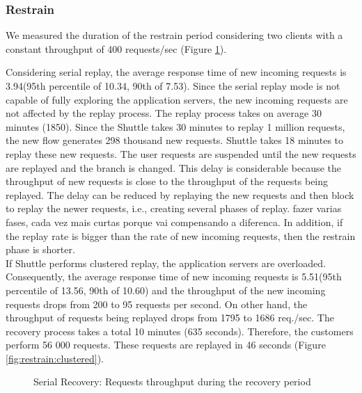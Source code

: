 \subsubsection{Restrain}\label{sec:eval:recovery:restrain}
We measured the duration of the restrain period considering two clients with a constant throughput of 400 requests/sec (Figure \ref{fig:restrain:serial}). 

Considering serial replay, the average response time of new incoming requests is 3.94\ms (95th percentile of 10.34\ms, 90th of 7.53\ms). Since the serial replay mode is not capable of fully exploring the application servers, the new incoming requests are not affected by the replay process. The replay process takes on average 30 minutes (1850\ms). Since the Shuttle takes 30 minutes to replay 1 million requests, the new flow generates 298 thousand new requests. Shuttle takes 18 minutes to replay these new requests. The user requests are suspended until the new requests are replayed and the branch is changed. This delay is considerable because the throughput of new requests is close to the throughput of the requests being replayed. The delay can be reduced by replaying the new requests and then block to replay the newer requests, i.e., creating several phases of replay. fazer varias fases, cada vez mais curtas porque vai compensando a diferenca. In addition, if the replay rate is bigger than the rate of new incoming requests, then the restrain phase is shorter.\\

If Shuttle performs clustered replay, the application servers are overloaded. Consequently, the average response time of new incoming requests is 5.51\ms (95th percentile of 13.56\ms, 90th of 10.60\ms) and the throughput of the new incoming requests drops from 200 to 95 requests per second. On other hand, the throughput of requests being replayed drops from 1795 to 1686 req./sec. The recovery process takes a total 10 minutes (635 seconds). Therefore, the customers perform 56 000 requests. These requests are replayed in 46 seconds (Figure \ref{fig:restrain:clustered}). 



    
\begin{figure}[!htb] 
    \centering
    \resizebox{0.7\linewidth}{!}{}
    \caption{Serial Recovery: Requests throughput during the recovery period}
    \label{fig:restrain:serial}
\end{figure}
    
